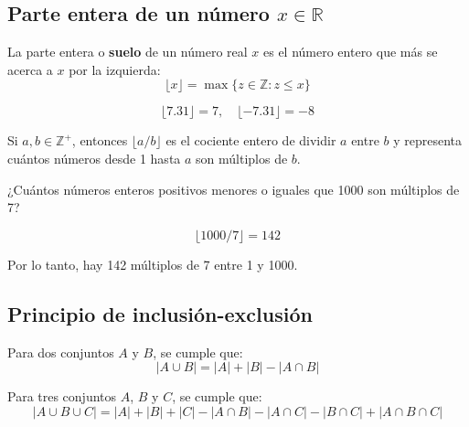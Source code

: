 \documentclass[a4paper,12pt]{article}
\begin{document}
\subsection{Parte entera de un número $x \in \mathbb{R}$}

\begin{procedimiento}[title=Definición de parte entera]
La parte entera o \textbf{suelo} de un número real $x$ es el número entero que más se acerca a $x$ por la izquierda:
\[
\lfloor x \rfloor = \max \{ z \in \mathbb{Z} : z \le x \}
\]
\end{procedimiento}

\begin{ejemplo}[title=Ejemplos de parte entera]
\[
\lfloor 7.31 \rfloor = 7, \quad \lfloor -7.31 \rfloor = -8
\]
\end{ejemplo}

\begin{procedimiento}[title=Parte entera de un cociente]
Si $a, b \in \mathbb{Z}^+$, entonces $\lfloor a/b \rfloor$ es el cociente entero de dividir $a$ entre $b$ y representa cuántos números desde 1 hasta $a$ son múltiplos de $b$.
\end{procedimiento}

\begin{ejemplo}[title=Ejemplo de múltiplos]
¿Cuántos números enteros positivos menores o iguales que 1000 son múltiplos de 7?

\[
\lfloor 1000/7 \rfloor = 142
\]

Por lo tanto, hay 142 múltiplos de 7 entre 1 y 1000.
\end{ejemplo}

\subsection{Principio de inclusión-exclusión}

\begin{procedimiento}[title=Inclusión-exclusión para dos conjuntos]
Para dos conjuntos $A$ y $B$, se cumple que:
\[
|A \cup B| = |A| + |B| - |A \cap B|
\]
\end{procedimiento}

\begin{procedimiento}[title=Inclusión-exclusión para tres conjuntos]
Para tres conjuntos $A$, $B$ y $C$, se cumple que:
\[
|A \cup B \cup C| = |A| + |B| + |C| - |A \cap B| - |A \cap C| - |B \cap C| + |A \cap B \cap C|
\]
\end{procedimiento}
\end{document}
